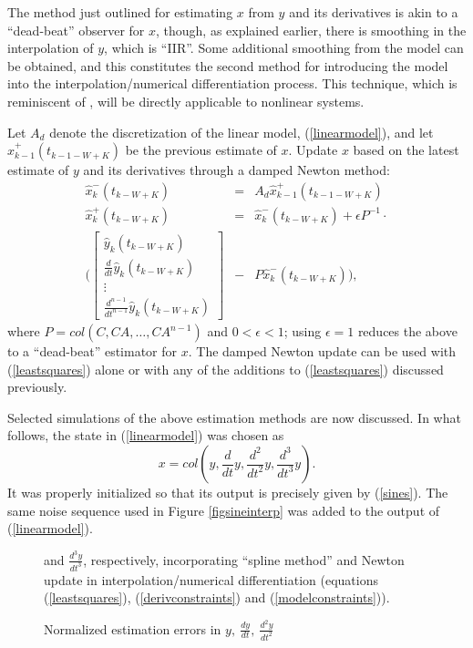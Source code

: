 The method just outlined for estimating $x$ from $y$ and its derivatives is akin to
a ``dead-beat'' observer for $x$, though, as explained
earlier, there is smoothing in the
interpolation of $y$, which is ``IIR''.  Some additional smoothing from the
model can be obtained, and this constitutes the second method for introducing
the model into the interpolation/numerical differentiation process.
This technique, which is reminiscent of
\cite{grizzle1990b,moraal1992}, 
will be
directly applicable to nonlinear systems.  

Let $A_d$ denote the discretization of the linear model, (\ref{linearmodel}),
and let $\hat{x}_{k-1}^{+}(t_{k-1-W+K})$ be the previous estimate of $x$.  Update $x$
based on the latest estimate of $y$ and its derivatives through a damped Newton
method:
\begin{eqnarray}
\hat{x}_{k}^{-}(t_{k-W+K}) & = & A_d \hat{x}_{k-1}^{+}(t_{k-1-W+K}) \nonumber \\
\hat{x}_{k}^{+}(t_{k-W+K}) & = & \hat{x}_{k}^{-}(t_{k-W+K}) + 
      \epsilon P^{-1} \cdot \nonumber \\
   ( \left[ \begin{array}{l} 
\hat{y}_{k}(t_{k-W+K}) \\
\frac{d}{dt} \hat{y}_{k}(t_{k-W+K}) \\ 
\vdots \\ 
\frac{d^{n-1}}{dt^{n-1}} \hat{y}_{k}(t_{k-W+K}) \end{array} \right]& -& 
P  \hat{x}_{k}^{-}(t_{k-W+K}) ),\label{newton} 
\end{eqnarray}
where $P=col (C, CA, \ldots, CA^{n-1})$ and $0 < \epsilon <  1$; using $\epsilon = 1$ reduces the above to a ``dead-beat''
estimator for $x$.  The damped Newton update can be used with
(\ref{leastsquares}) alone or with any of
the additions to (\ref{leastsquares}) discussed previously.

Selected simulations of the above estimation methods are now discussed.
In what follows,
the state in (\ref{linearmodel}) was chosen as 
$$ x = col( y,  \frac{d}{dt} y ,  \frac{d^2}{dt^2} y , \frac{d^3}{dt^3} y).$$
It was properly initialized so that its output is precisely
given by (\ref{sines}).  The same noise sequence used in
Figure \ref{figsineinterp} was added to the output of (\ref{linearmodel}).


\begin{figure}[hbt]
\centerline{}

\caption{\small Normalized estimation errors in \protect$y, \ \frac{dy}{dt}, \
\frac{d^2y}{dt^2}$} 
and  \protect$\frac{d^3y}{dt^3}$, respectively, incorporating 
``spline method'' and
Newton update in interpolation/numerical differentiation (equations
(\protect\ref{leastsquares}), (\protect\ref{derivconstraints}) and
(\protect\ref{modelconstraints})).
\label{figsinespline}
\end{figure}


